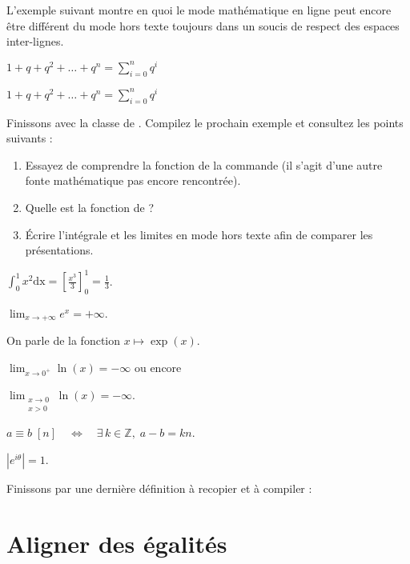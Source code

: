 L'exemple suivant montre en quoi le mode mathématique en ligne peut encore être différent du mode hors texte toujours dans un soucis de respect des espaces inter-lignes.\bigskip

{\NewFont
\begin{SideBySideExample}
    $1 + q + q^2 + \dots + q^n =
    \sum_{i = 0}^n q^i$\medskip

    $1 + q + q^2 + \dots + q^n =
    \displaystyle{\sum_{i = 0}^n q^i}$
\end{SideBySideExample}
}\bigskip

Finissons avec la classe de . Compilez le prochain exemple et consultez les points suivants :
\begin{enumerate}
    \item Essayez de comprendre la fonction de la commande  (il s'agit d'une autre fonte mathématique pas encore rencontrée).
    \item Quelle est la fonction de  ?
    \item \'Ecrire l'intégrale et les limites en mode hors texte afin de comparer les présentations.
\end{enumerate}

{\NewFont
\begin{SideBySideExample}
    $\int_0^1 x^2 \mathrm{dx} =
        \left[\frac{x^3}{3}\right]_0^1 =
        \frac 13$.\medskip

    $\lim_{x \to +\infty} e^x= +\infty$.\par
    On parle de la fonction $x \mapsto \exp(x)$.\medskip

    $\lim_{x \to 0^+}\ln(x) = -\infty$ ou encore\par
    $\lim_{\substack{x \to 0 \\ x > 0}}
            \ln(x) = -\infty$.\medskip

    $a \equiv b\; [n] \quad\Leftrightarrow\quad
        \exists\, k \in \mathds Z,\; a - b = kn$.\medskip

    $\left\lvert e^{i\theta}\right\rvert = 1$.
\end{SideBySideExample}
}\bigskip

Finissons par une dernière définition à recopier et à compiler :


\section{Aligner des égalités}


